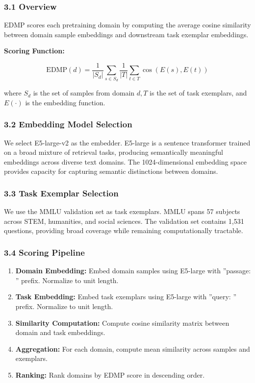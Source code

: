 
\subsubsection{3.1 Overview}

EDMP scores each pretraining domain by computing the average cosine similarity between domain sample embeddings and downstream task exemplar embeddings.

\textbf{Scoring Function:}

$$\text{EDMP}(d) = \frac{1}{|S_d|} \sum_{s \in S_d} \frac{1}{|T|} \sum_{t \in T} \cos(E(s), E(t))$$

where $S_d$ is the set of samples from domain $d, T$ is the set of task exemplars, and $E(\cdot)$ is the embedding function.

\subsubsection{3.2 Embedding Model Selection}

We select E5-large-v2 as the embedder. E5-large is a sentence transformer trained on a broad mixture of retrieval tasks, producing semantically meaningful embeddings across diverse text domains. The 1024-dimensional embedding space provides capacity for capturing semantic distinctions between domains.

\subsubsection{3.3 Task Exemplar Selection}

We use the MMLU validation set as task exemplars. MMLU spans 57 subjects across STEM, humanities, and social sciences. The validation set contains 1,531 questions, providing broad coverage while remaining computationally tractable.

\subsubsection{3.4 Scoring Pipeline}

\begin{enumerate}
\item \textbf{Domain Embedding:} Embed domain samples using E5-large with ''passage: '' prefix. Normalize to unit length.
\item \textbf{Task Embedding:} Embed task exemplars using E5-large with ''query: '' prefix. Normalize to unit length.
\item \textbf{Similarity Computation:} Compute cosine similarity matrix between domain and task embeddings.
\item \textbf{Aggregation:} For each domain, compute mean similarity across samples and exemplars.
\item \textbf{Ranking:} Rank domains by EDMP score in descending order.
\end{enumerate}

